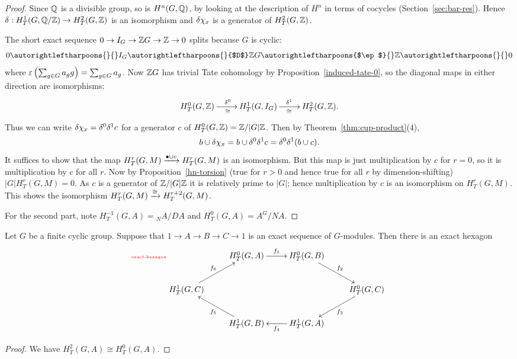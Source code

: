 \begin{proof}
Since $\mathbb{Q}$ is a divisible group, so is $H^n(G,\mathbb{Q})$, by looking at the description of $H^n$ in terms of cocycles (Section~\ref{sec:bar-res}). Hence $\delta:H_T^1(G,\mathbb{Q}/\mathbb{Z})\to H_T^2(G,\mathbb{Z})$ is an isomorphism and $\delta\chi_x$ is a generator of $H_T^2(G,\mathbb{Z})$.

The short exact sequence $0\to I_G\to \mathbb{Z} G\to \mathbb{Z}\to 0$ splits because $G$ is cyclic:
\begin{align*}
0 \autorightleftharpoons{}{} I_G
\autorightleftharpoons{}{$D$} \Z G \autorightleftharpoons{$\ep$}{} \Z \autorightleftharpoons{}{} 0
\end{align*}
where $\varepsilon\left( {\sum_{g\in G}a_gg} \right)=\sum_{g\in G}a_g$. Now $\mathbb{Z} G$ has trivial Tate cohomology by Proposition~\ref{induced-tate-0}, so the diagonal maps in either direction are isomorphisms:
\[
\xymatrix{
H_T^0(G,\Z) \ar[r]^{\de^0}_{\cong} &
H_T^1(G,I_G)\ar[r]^{\de^1}_{\cong} &
H_T^2(G,\Z).
}
\]
Thus we can write $\delta \chi_x=\delta^0\delta^1c$ for a generator $c$ of $H_T^0(G,\mathbb{Z})=\mathbb{Z}/|G|\mathbb{Z}$. Then by Theorem~\ref{thm:cup-product}(4),
\[
b\cup \delta\chi_x=b\cup \delta^0\delta^1c=\delta^0 \delta^1(b\cup c).
\]
It suffices to show that the map $H_T^r(G,M)\xrightarrow{\bullet\cup c} H_T^r(G,M)$ is an isomorphism. But this map is just multiplication by $c$ for $r=0$, so it is multiplication by $c$ for all $r$. Now by Proposition~\ref{hn-torsion} (true for $r>0$ and hence true for all $r$ by dimension-shifting) $|G|H_T^r(G,M)=0$. As $c$ is a generator of $\mathbb{Z}/|G|\mathbb{Z}$ it is relatively prime to $|G|$; hence multiplication by $c$ is an isomorphism on $H_T^r(G,M)$. This shows the isomorphism $H_T^r(G,M)\xrightarrow{\cong}H_T^{r+2}(G,M)$.

For the second part, note $H_T^{-1}(G,A)={}_NA/DA$ and 
$H_T^{0}(G, A)=A^G/NA$.
\end{proof}
\begin{cor}%
Let $G$ be a finite cyclic group. Suppose that $1\to A\to B \to C\to 1$ is an exact sequence of $G$-modules. Then there is an exact hexagon
\begin{equation}\llabel{exact-hexagon}
\xymatrix{
& H_T^0(G,A) \ar[r]^{f_1} & H_T^0(G,B) \ar[rd]^{f_2}& \\
H_T^1(G,C)\ar[ru]^{f_6} & & & H_T^0(G,C) \ar[ld]^{f_3}\\
&H_T^1(G,B)\ar[lu]^{f_5} & H_T^1(G,A)\ar[l]^{f_4} &
}
\end{equation}
\end{cor}
\begin{proof}
We have $H_T^2(G,A)\cong H_T^0(G,A)$.
\end{proof}
